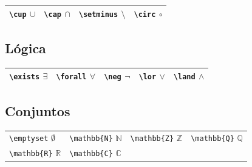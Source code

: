 \documentclass[
  letterpaper,
  DIV=11,
  numbers=noendperiod]{scrreport}
\begin{document}
\begin{longtable}[]{@{}
  >{\raggedright\arraybackslash}p{}
  >{\raggedright\arraybackslash}p{}
  >{\raggedright\arraybackslash}p{}
  >{\raggedright\arraybackslash}p{}@{}}
\toprule()
\endhead
\texttt{\textbackslash{}cup} \(\cup\) & \texttt{\textbackslash{}cap}
\(\cap\) & \texttt{\textbackslash{}setminus} \(\setminus\) &
\texttt{\textbackslash{}circ} \(\circ\) \\
\bottomrule()
\end{longtable}

\hypertarget{luxf3gica}{%
\subsection{Lógica}\label{luxf3gica}}

\begin{longtable}[]{@{}
  >{\raggedright\arraybackslash}p{}
  >{\raggedright\arraybackslash}p{}
  >{\raggedright\arraybackslash}p{}
  >{\raggedright\arraybackslash}p{}
  >{\raggedright\arraybackslash}p{}@{}}
\toprule()
\endhead
\texttt{\textbackslash{}exists} \(\exists\) &
\texttt{\textbackslash{}forall} \(\forall\) &
\texttt{\textbackslash{}neg} \(\neg\) & \texttt{\textbackslash{}lor}
\(\lor\) & \texttt{\textbackslash{}land} \(\land\) \\
\bottomrule()
\end{longtable}

\hypertarget{conjuntos}{%
\subsection{Conjuntos}\label{conjuntos}}

\begin{longtable}[]{@{}
  >{\raggedright\arraybackslash}p{}
  >{\raggedright\arraybackslash}p{}
  >{\raggedright\arraybackslash}p{}
  >{\raggedright\arraybackslash}p{}@{}}
\toprule()
\endhead
\texttt{\textbackslash{}emptyset} \(\emptyset\) &
\texttt{\textbackslash{}mathbb\{N\}} \(\mathbb{N}\) &
\texttt{\textbackslash{}mathbb\{Z\}} \(\mathbb{Z}\) &
\texttt{\textbackslash{}mathbb\{Q\}} \(\mathbb{Q}\) \\
\texttt{\textbackslash{}mathbb\{R\}} \(\mathbb{R}\) &
\texttt{\textbackslash{}mathbb\{C\}} \(\mathbb{C}\) & & \\
\bottomrule()
\end{longtable}
\end{document}
